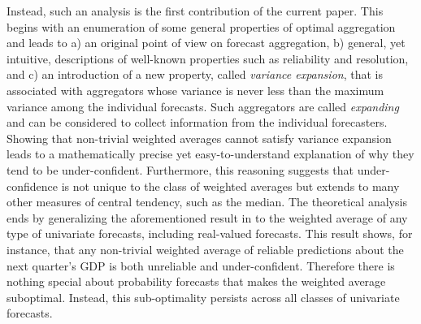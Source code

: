 \documentclass[11pt]{article}
\theoremstyle{definition}
\theoremstyle{definition}
\begin{document}
Instead, such an analysis is the first contribution of the current paper. This begins with an enumeration of some general properties of optimal aggregation and leads to
 a) an original point of view on forecast aggregation, b) general, yet intuitive, descriptions of well-known properties
such as reliability and resolution, and c) an introduction of a new property, called \textit{variance expansion}, that is associated with aggregators whose variance is
never less than the maximum variance among the individual
forecasts. Such aggregators are called \textit{expanding} and can be considered to collect information from the individual forecasters. Showing that non-trivial weighted averages cannot satisfy
variance expansion leads to a mathematically precise yet
easy-to-understand explanation of why they tend to be
under-confident.  Furthermore, this reasoning suggests that
under-confidence is not unique to the class of weighted averages but
extends to many other measures of central tendency, such as the
median. The theoretical analysis ends by generalizing the aforementioned result
in \cite{Ranjan08} to the weighted average of any type of univariate
forecasts, including real-valued forecasts.
This result shows, for instance, that any non-trivial
weighted average of reliable predictions about the next quarter's GDP
is both unreliable and under-confident. Therefore there is nothing special about probability forecasts that makes the weighted average suboptimal. Instead, this sub-optimality persists across all classes of univariate forecasts. 

\end{document}
